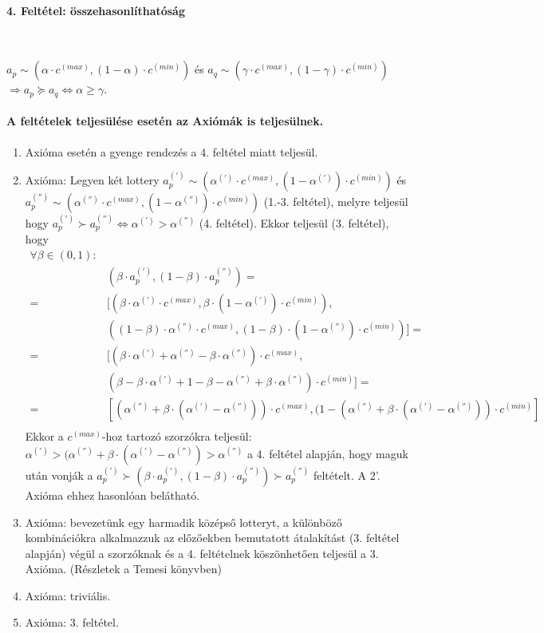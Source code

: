 \documentclass[a4paper,12pt]{article}
\begin{document}
\paragraph{4. Feltétel: összehasonlíthatóság}

\

$a_p \sim (\alpha \cdot c^{(max)}, (1-\alpha) \cdot c^{(min)})$ és 
$a_q \sim (\gamma \cdot c^{(max)}, (1-\gamma) \cdot c^{(min)})$ $\Rightarrow a_p \succeq a_q \Leftrightarrow \alpha \geq \gamma$. 

\paragraph{A feltételek teljesülése esetén az Axiómák is teljesülnek.}

\begin{enumerate}
\item Axióma esetén a gyenge rendezés a 4. feltétel miatt teljesül.
\item Axióma: Legyen két lottery $a^{(')}_p \sim (\alpha^{(')}\cdot c^{(max)}, (1-\alpha^{(')})\cdot c^{(min)})$ és 
$a^{('')}_p \sim (\alpha^{('')}\cdot c^{(max)}, (1-\alpha^{('')})\cdot c^{(min)})$ (1.-3. feltétel), melyre teljesül hogy $a^{(')}_p \succ a^{('')}_p \Leftrightarrow \alpha^{(')} > \alpha^{('')}$ (4. feltétel). Ekkor teljesül (3. feltétel), hogy
\begin{equation}
\begin{split}
\forall \beta \in (0,1):& \\
& (\beta\cdot a^{(')}_p, (1-\beta)\cdot a^{('')}_p) = \\ 
= & [(\beta\cdot \alpha^{(')}\cdot c^{(max)}, \beta\cdot (1-\alpha^{(')})\cdot c^{(min)}), \\
& ((1-\beta)\cdot \alpha^{('')}\cdot c^{(max)}, (1-\beta)\cdot (1-\alpha^{('')})\cdot c^{(min)})] = \\
= & [(\beta\cdot \alpha^{(')} + \alpha^{('')}-\beta\cdot \alpha^{('')} )\cdot c^{(max)},\\
& (\beta-\beta\cdot \alpha^{(')} + 1-\beta-\alpha^{('')}+\beta\cdot \alpha^{('')})\cdot c^{(min)}] = \\ 
= & [(\alpha^{('')} + \beta\cdot (\alpha^{(')} - \alpha^{('')} ))\cdot c^{(max)},(1 - (\alpha^{('')} + \beta\cdot (\alpha^{(')} - \alpha^{('')} ))\cdot c^{(min)}] \\
\end{split}
\end{equation} 
Ekkor a $c^{(max)}$-hoz tartozó szorzókra teljesül: $\alpha^{(')} >(\alpha^{('')} + \beta\cdot (\alpha^{(')} - \alpha^{('')}) > \alpha^{('')}$ a 4. feltétel alapján, hogy maguk után vonják a $a^{(')}_p \succ (\beta\cdot a^{(')}_p , (1-\beta)\cdot a^{('')}_p ) \succ a^{('')}_p$ feltételt. A 2'. Axióma ehhez hasonlóan belátható.
\item Axióma: bevezetünk egy harmadik középső lotteryt, a különböző kombinációkra alkalmazzuk az előzőekben bemutatott átalakítást (3. feltétel alapján) végül a szorzóknak és a 4. feltételnek köszönhetően teljesül a 3. Axióma. (Részletek a Temesi könyvben) 
\item Axióma: triviális.
\item Axióma: 3. feltétel.
\end{enumerate}
\end{document}
